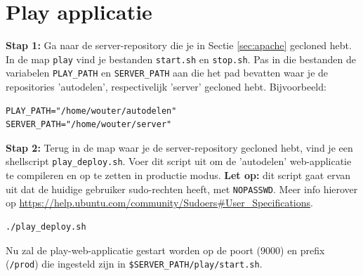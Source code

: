 \documentclass[11pt,a4paper,oneside]{article}
\begin{document}
\section{Play applicatie}
\textbf{Stap 1:} Ga naar de server-repository die je in Sectie \ref{sec:apache} gecloned hebt. In de map \verb|play| vind je bestanden \verb|start.sh| en \verb|stop.sh|. Pas in die bestanden de variabelen \verb|PLAY_PATH| en \verb|SERVER_PATH| aan die het pad bevatten waar je de repositories 'autodelen', respectivelijk 'server' gecloned hebt. Bijvoorbeeld:
\vspace{-1.7em}\begin{lstlisting}
PLAY_PATH="/home/wouter/autodelen"
SERVER_PATH="/home/wouter/server"
\end{lstlisting}\par
\textbf{Stap 2:} Terug in de map waar je de server-repository gecloned hebt, vind je een shellscript \verb|play_deploy.sh|. Voer dit script uit om de 'autodelen' web-applicatie te compileren en op te zetten in productie modus. \textbf{Let op:} dit script gaat ervan uit dat de huidige gebruiker sudo-rechten heeft, met \verb|NOPASSWD|. Meer info hierover op \url{https://help.ubuntu.com/community/Sudoers#User_Specifications}.
\vspace{-1.7em}\begin{lstlisting}
./play_deploy.sh
\end{lstlisting}
Nu zal de play-web-applicatie gestart worden op de poort ($9000$) en prefix (\verb|/prod|) die ingesteld zijn in \verb|$SERVER_PATH/play/start.sh|.
\par
\end{document}
